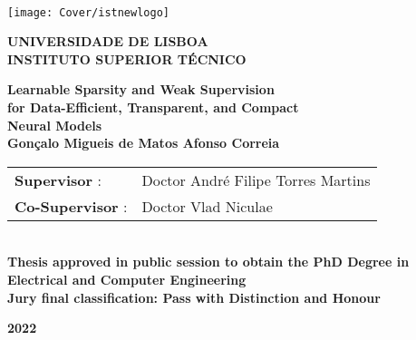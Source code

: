 \setcounter{page}{1} 


\thispagestyle{empty}
\begin{flushleft} ~\\ \vspace{-12mm} \hspace{-12mm}  \texttt{[image: Cover/istnewlogo]}

    \centering
    \LARGE \textbf{UNIVERSIDADE DE LISBOA \\ INSTITUTO SUPERIOR TÉCNICO}
    \vspace{30mm}


    \centering
    \LARGE \textbf{Learnable Sparsity and Weak Supervision\\for Data-Efficient, Transparent, and Compact\\Neural Models}
    \\ \vspace{25mm}  %
    \LARGE \textbf{Gonçalo Migueis de Matos Afonso Correia} \\
    \vspace{25mm}

    \Large %
    \begin{minipage}{\textwidth}
        \hspace{10mm}
        \begin{tabularx}{\textwidth}{ l @{ } l }
            \centering
            \textbf{Supervisor} :    & Doctor André Filipe Torres Martins \\
            \textbf{Co-Supervisor} : & Doctor Vlad Niculae                \\
        \end{tabularx}
    \end{minipage}
    \\ \vspace{20mm}
    \centering
    \Large \textbf{Thesis approved in public session to obtain the PhD Degree in}\\
    \Large \textbf{Electrical and Computer Engineering}\\
    \vspace{10mm}
    \Large \textbf{Jury final classification:  Pass with Distinction and Honour}\\
    \vspace{20mm}

    \Large \textbf{2022} \\
    \let\thepage\relax
\end{flushleft}
\pagebreak
